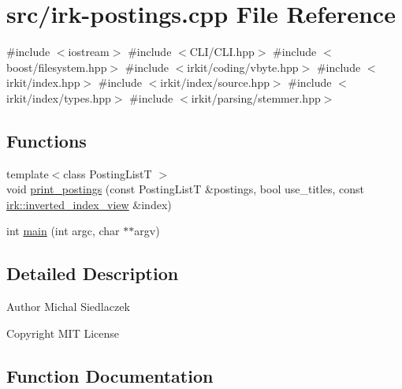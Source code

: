 \hypertarget{irk-postings_8cpp}{}\section{src/irk-\/postings.cpp File Reference}
\label{irk-postings_8cpp}
{\ttfamily \#include $<$iostream$>$}\newline
{\ttfamily \#include $<$C\+L\+I/\+C\+L\+I.\+hpp$>$}\newline
{\ttfamily \#include $<$boost/filesystem.\+hpp$>$}\newline
{\ttfamily \#include $<$irkit/coding/vbyte.\+hpp$>$}\newline
{\ttfamily \#include $<$irkit/index.\+hpp$>$}\newline
{\ttfamily \#include $<$irkit/index/source.\+hpp$>$}\newline
{\ttfamily \#include $<$irkit/index/types.\+hpp$>$}\newline
{\ttfamily \#include $<$irkit/parsing/stemmer.\+hpp$>$}\newline
\subsection*{Functions}
\begin{DoxyCompactItemize}
\item 
{\footnotesize template$<$class Posting\+ListT $>$ }\\void \mbox{\hyperlink{irk-postings_8cpp_a8fd168baf0349318b98384a15e1ed018}{print\+\_\+postings}} (const Posting\+ListT \&postings, bool use\+\_\+titles, const \mbox{\hyperlink{namespaceirk_a137711df98ba695c3526ba4004853a47}{irk\+::inverted\+\_\+index\+\_\+view}} \&index)
\item 
int \mbox{\hyperlink{irk-postings_8cpp_a3c04138a5bfe5d72780bb7e82a18e627}{main}} (int argc, char $\ast$$\ast$argv)
\end{DoxyCompactItemize}


\subsection{Detailed Description}
\begin{DoxyAuthor}{Author}
Michal Siedlaczek 
\end{DoxyAuthor}
\begin{DoxyCopyright}{Copyright}
M\+IT License 
\end{DoxyCopyright}


\subsection{Function Documentation}
\mbox{\label{irk-postings_8cpp_a3c04138a5bfe5d72780bb7e82a18e627}} 
